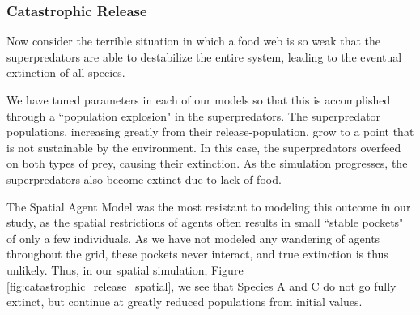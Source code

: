 \documentclass[journal]{IEEEtran}
\begin{document}
\newpage

\subsubsection{Catastrophic Release}
Now consider the terrible situation in which a food web is so weak that the superpredators are able to destabilize the entire system, leading to the eventual extinction of all species.\par
We have tuned parameters in each of our models so that this is accomplished through a ``population explosion" in the superpredators. The superpredator populations, increasing greatly from their release-population, grow to a point that is not sustainable by the environment. In this case, the superpredators overfeed on both types of prey, causing their extinction. As the simulation progresses, the superpredators also become extinct due to lack of food.\par
The Spatial Agent Model was the most resistant to modeling this outcome in our study, as the spatial restrictions of agents often results in small ``stable pockets" of only a few individuals. As we have not modeled any wandering of agents throughout the grid, these pockets never interact, and true extinction is thus unlikely. Thus, in our spatial simulation, Figure \ref{fig:catastrophic_release_spatial}, we see that Species A and C do not go fully extinct, but continue at greatly reduced populations from initial values.
\end{document}
